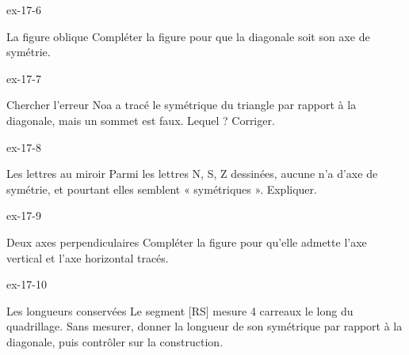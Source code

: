 \begin{blocLivre}{ex-17-6}\begin{exercice}[2]{La figure oblique}
Compléter la figure pour que la diagonale soit son axe de symétrie.
\label{fig-ex-17-6}
\end{exercice}\end{blocLivre}
\begin{blocLivre}{ex-17-7}\begin{exercice}[2]{Chercher l’erreur}
Noa a tracé le symétrique du triangle par rapport à la diagonale, mais un sommet est faux. Lequel ? Corriger.
\label{fig-ex-17-7}
\end{exercice}\end{blocLivre}
\begin{blocLivre}{ex-17-8}\begin{exercice}[2]{Les lettres au miroir}
Parmi les lettres N, S, Z dessinées, aucune n’a d’axe de symétrie, et pourtant elles semblent « symétriques ». Expliquer.
\label{fig-ex-17-8}
\end{exercice}\end{blocLivre}
\begin{blocLivre}{ex-17-9}\begin{exercice}[2]{Deux axes perpendiculaires}
Compléter la figure pour qu’elle admette l’axe vertical et l’axe horizontal tracés.
\label{fig-ex-17-9}
\end{exercice}\end{blocLivre}
\begin{blocLivre}{ex-17-10}\begin{exercice}[2]{Les longueurs conservées}
Le segment [RS] mesure 4 carreaux le long du quadrillage. Sans mesurer, donner la longueur de son symétrique par rapport à la diagonale, puis contrôler sur la construction.
\label{fig-ex-17-10}
\end{exercice}\end{blocLivre}

